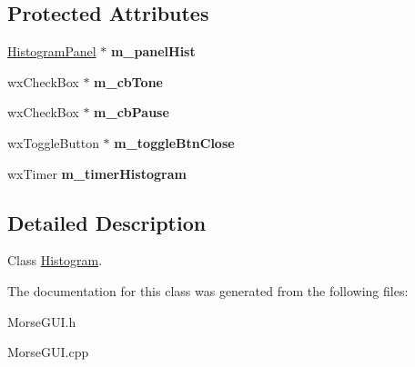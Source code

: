 \subsection*{Protected Attributes}
\begin{DoxyCompactItemize}
\item 
\mbox{\label{classHistogram_a84914a90805e53e1772348bb129edc26}} 
\hyperlink{classHistogramPanel}{Histogram\+Panel} $\ast$ {\bfseries m\+\_\+panel\+Hist}
\item 
\mbox{\label{classHistogram_acac21af654ed9b2e6e90fd957e92859d}} 
wx\+Check\+Box $\ast$ {\bfseries m\+\_\+cb\+Tone}
\item 
\mbox{\label{classHistogram_a1b161161082e334fe83327d08cc1dd37}} 
wx\+Check\+Box $\ast$ {\bfseries m\+\_\+cb\+Pause}
\item 
\mbox{\label{classHistogram_adffc183d36824c3b867ae9d43b108d23}} 
wx\+Toggle\+Button $\ast$ {\bfseries m\+\_\+toggle\+Btn\+Close}
\item 
\mbox{\label{classHistogram_a8d2b895f5dde01625d3981acd64e5b3c}} 
wx\+Timer {\bfseries m\+\_\+timer\+Histogram}
\end{DoxyCompactItemize}


\subsection{Detailed Description}
Class \hyperlink{classHistogram}{Histogram}. 

The documentation for this class was generated from the following files\+:\begin{DoxyCompactItemize}
\item 
Morse\+G\+U\+I.\+h\item 
Morse\+G\+U\+I.\+cpp\end{DoxyCompactItemize}
